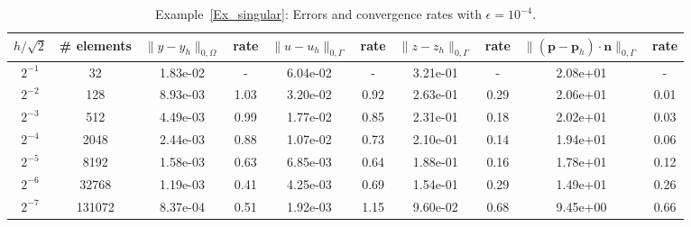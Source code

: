 \documentclass[a4paper,10pt]{article}
\newcommand{\bp}{{\mathbf{p}}}
\numberwithin{theorem}{section}
\begin{document}
\begin{table}[H]
\centering
\caption{Example~\ref{Ex_singular}: Errors and convergence rates with $\epsilon=10^{-4}$.}
\resizebox{\textwidth}{!}
{%
\begin{tabular}{c |c | c c | c c | c c | c c}
$h/\sqrt{2}$
&\# elements 
& $\|y-y_h\|_{0,\Omega}$ & rate
& $\|u-u_h\|_{0,\Gamma}$ & rate
& $\|z-z_h\|_{0,\Gamma}$ & rate
& $\|(\bp-\bp_h)\cdot \mathbf n\|_{0,\Gamma}$ & rate \\
\hline
$2^{-1}$
&32     
& 1.83e-02 & -    
& 6.04e-02 & -    
& 3.21e-01 & -    
& 2.08e+01 & -    \\

$2^{-2}$
&128    
& 8.93e-03 & 1.03 
& 3.20e-02 & 0.92 
& 2.63e-01 & 0.29 
& 2.06e+01 & 0.01 \\

$2^{-3}$
&512    
& 4.49e-03 & 0.99 
& 1.77e-02 & 0.85 
& 2.31e-01 & 0.18 
& 2.02e+01 & 0.03 \\

$2^{-4}$
&2048   
& 2.44e-03 & 0.88 
& 1.07e-02 & 0.73 
& 2.10e-01 & 0.14 
& 1.94e+01 & 0.06 \\

$2^{-5}$
&8192   
& 1.58e-03 & 0.63 
& 6.85e-03 & 0.64 
& 1.88e-01 & 0.16 
& 1.78e+01 & 0.12 \\

$2^{-6}$
&32768  
& 1.19e-03 & 0.41 
& 4.25e-03 & 0.69 
& 1.54e-01 & 0.29 
& 1.49e+01 & 0.26 \\

$2^{-7}$
&131072 
& 8.37e-04 & 0.51 
& 1.92e-03 & 1.15 
& 9.60e-02 & 0.68 
& 9.45e+00 & 0.66 \\

\hline
\end{tabular}
}
\label{Ex2_combined_table_eps4}
\end{table}
\end{document}
